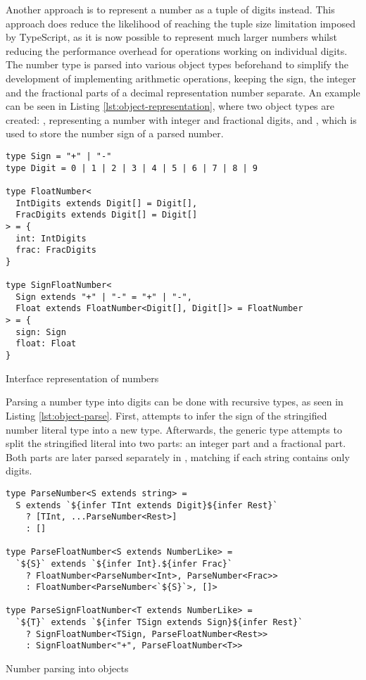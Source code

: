 Another approach is to represent a number as a tuple of digits instead. This approach does reduce the likelihood of reaching the tuple size limitation imposed by TypeScript, as it is now possible to represent much larger numbers whilst reducing the performance overhead for operations working on individual digits. The number type is parsed into various object types beforehand to simplify the development of implementing arithmetic operations, keeping the sign, the integer and the fractional parts of a decimal representation number separate. An example can be seen in Listing \ref{lst:object-representation}, where two object types are created: , representing a number with integer and fractional digits, and , which is used to store the number sign of a parsed number.

\begin{listing}[ht]
  \begin{verbatim}
type Sign = "+" | "-"
type Digit = 0 | 1 | 2 | 3 | 4 | 5 | 6 | 7 | 8 | 9

type FloatNumber<
  IntDigits extends Digit[] = Digit[],
  FracDigits extends Digit[] = Digit[]
> = {
  int: IntDigits
  frac: FracDigits
}

type SignFloatNumber<
  Sign extends "+" | "-" = "+" | "-",
  Float extends FloatNumber<Digit[], Digit[]> = FloatNumber
> = {
  sign: Sign
  float: Float
}
\end{verbatim}
  \caption{Interface representation of numbers}\label{lst:object-representation}
\end{listing}

Parsing a number type into digits can be done with recursive types, as seen in Listing \ref{lst:object-parse}. First,  attempts to infer the sign of the stringified number literal type into a new  type. Afterwards, the  generic type attempts to split the stringified literal into two parts: an integer part and a fractional part. Both parts are later parsed separately in , matching if each string contains only digits.

\begin{listing}[ht]
  \begin{verbatim}
type ParseNumber<S extends string> =
  S extends `${infer TInt extends Digit}${infer Rest}`
    ? [TInt, ...ParseNumber<Rest>]
    : []

type ParseFloatNumber<S extends NumberLike> =
  `${S}` extends `${infer Int}.${infer Frac}`
    ? FloatNumber<ParseNumber<Int>, ParseNumber<Frac>>
    : FloatNumber<ParseNumber<`${S}`>, []>

type ParseSignFloatNumber<T extends NumberLike> =
  `${T}` extends `${infer TSign extends Sign}${infer Rest}`
    ? SignFloatNumber<TSign, ParseFloatNumber<Rest>>
    : SignFloatNumber<"+", ParseFloatNumber<T>>
\end{verbatim}
  \caption{Number parsing into objects}\label{lst:object-parse}
\end{listing}

